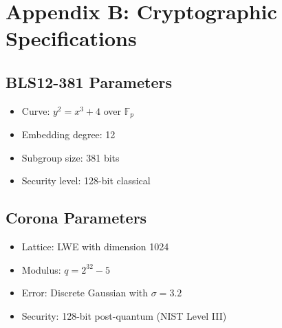 \section{Appendix B: Cryptographic Specifications}


\subsection{BLS12-381 Parameters}
\begin{itemize}
\item Curve: $y^2 = x^3 + 4$ over $\mathbb{F}_p$
\item Embedding degree: 12
\item Subgroup size: 381 bits
\item Security level: 128-bit classical
\end{itemize}

\subsection{Corona Parameters}
\begin{itemize}
\item Lattice: LWE with dimension 1024
\item Modulus: $q = 2^{32} - 5$
\item Error: Discrete Gaussian with $\sigma = 3.2$
\item Security: 128-bit post-quantum (NIST Level III)
\end{itemize}

